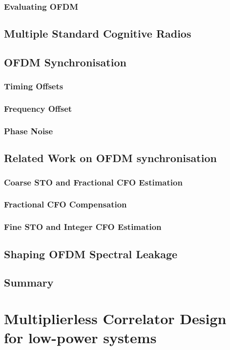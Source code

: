 		\subsection{Evaluating OFDM}
	\section{Multiple Standard Cognitive Radios }
	\section{OFDM Synchronisation}
		\subsection{Timing Offsets}
		\subsection{Frequency Offset}
		\subsection{Phase Noise}
	\section{Related Work on OFDM synchronisation}
		\subsection{Coarse STO and Fractional CFO Estimation}
		\subsection{Fractional CFO Compensation}
		\subsection{Fine STO and Integer CFO Estimation}
	\section{Shaping OFDM Spectral Leakage}
	\section{Summary}
%
\chapter{Multiplierless Correlator Design for low-power systems}
\label{chap:multiplierlesscorrelator}
